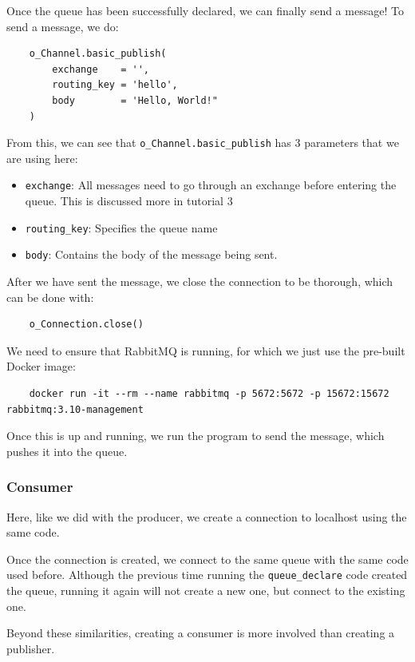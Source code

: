\documentclass{article}
\begin{document}
Once the queue has been successfully declared, we can finally send a message! To send a message, we do:

\begin{verbatim}
    o_Channel.basic_publish(
        exchange    = '',
        routing_key = 'hello',
        body        = 'Hello, World!"
    )
\end{verbatim}

From this, we can see that \verb|o_Channel.basic_publish| has 3 parameters that we are using here:

\begin{itemize}
    \item \verb|exchange|: All messages need to go through an exchange before entering the queue. This is discussed more in tutorial 3
    \item \verb|routing_key|: Specifies the queue name
    \item \verb|body|: Contains the body of the message being sent.
\end{itemize}

After we have sent the message, we close the connection to be thorough, which can be done with:

\begin{verbatim}
    o_Connection.close()
\end{verbatim}

We need to ensure that RabbitMQ is running, for which we just use the pre-built Docker image:

\begin{verbatim}
    docker run -it --rm --name rabbitmq -p 5672:5672 -p 15672:15672 rabbitmq:3.10-management
\end{verbatim}

Once this is up and running, we run the program to send the message, which pushes it into the queue.

\subsubsection{Consumer}

Here, like we did with the producer, we create a connection to localhost using the same code.

Once the connection is created, we connect to the same queue with the same code used before. Although the previous time running the \verb|queue_declare| code created the queue, running it again will not create a new one, but connect to the existing one.

Beyond these similarities, creating a consumer is more involved than creating a publisher. 
\end{document}
